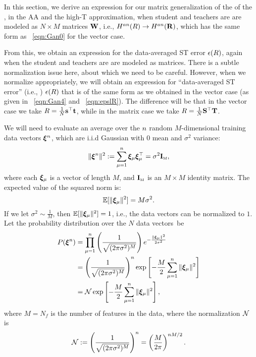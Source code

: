 In this section, we derive an expression for our matrix generalization of the \AnnealedHamiltonian of the \LinearPerceptron,
in the AA and the high-T approximation, when student and teachers are are modeled as $N \times M$ matrices ${\mathbf{W}}$,
i.e., $H^{an}(R)\rightarrow H^{an}(\mathbf{R})$, which has the same form as \EQN~\ref{eqn:Gan0} for the vector case.

From this, we obtain an expression for the data-averaged ST error $\epsilon(R)$, again when the student and teachers are are modeled as matrices.
There is a subtle normalization issue here, about which we need to be careful.
However, when we normalize appropriately, we will obtain an expression
for ``data-averaged ST error'' (i.e., \EffectivePotential) $\epsilon(R)$ that is of the same form as we obtained in the vector case (as given in \EQN~\ref{eqn:Gan4} and \EQN~\ref{eqn:epslR}).
%
The difference will be that in the vector case we take $R=\tfrac{1}{N}{\mathbf{s}}^{\top}{\mathbf{t}}$, while in the matrix case we take $R=\tfrac{1}{N}{\mathbf{S}}^{\top}{\mathbf{T}}$.

We will need to evaluate an average over the $n$ random $M$-dimensional training data vectors $\boldsymbol{\xi}^{n}$,
which are i.i.d Gaussian with $0$ mean and $\sigma^{2}$ variance: 
\begin{equation}
  \label{eqn:XInorm}
  \Vert \boldsymbol{\xi}^{n} \Vert^2 :=\sum_{\mu=1}^{n} \boldsymbol{\xi}_\mu \boldsymbol{\xi}_\mu^{\top} = \sigma^{2}\mathbf{I}_{\text{\tiny M}} ,
\end{equation}
where each $\boldsymbol{\xi}_{\mu}$ is a vector of length $M$, and $\mathbf{I}_{\text{\tiny M}}$ is an $M \times M$ identity matrix.
%
The expected value of the squared norm is:
\begin{equation}
\mathbb{E}[\Vert \boldsymbol{\xi}_{\mu} \Vert^2] = M \sigma^2 .
\end{equation}
If we let $\sigma^{2}\sim\tfrac{1}{M}$, 
then $\mathbb{E}[\Vert \boldsymbol{\xi}_{\mu} \Vert^2]=1$, i.e., the data vectors can be normalized to $1$.
%
Let the probability distribution over the $N$ data vectors~be
\begin{align}
\nonumber
  P(\boldsymbol{\xi}^{n}) &= \prod_{\mu=1}^{n} \left( \frac{1}{\sqrt{(2 \pi \sigma^2)^M}} \right) e^{-\frac{\|\boldsymbol{\xi}_{\mu}\|^2}{2 \sigma^2}} \\ 
\nonumber
  &= \left( \frac{1}{\sqrt{(2 \pi \sigma^2)^M}} \right)^{n} \exp\left[-\frac{M}{2}\sum_{\mu=1}^{n}\|\boldsymbol{\xi}_{\mu}\|^2\right] \\ 
  \label{eqn:pndx_vec}
  &= \mathcal{N} \exp\left[-\frac{M}{2}\sum_{\mu=1}^{n}\|\boldsymbol{\xi}_{\mu}\|^2\right] ,
\end{align}
where $M=N_f$ is the number of features in the data, where the normalization $\mathcal{N}$ is
\begin{align}
\label{eqn:xinorm}
\mathcal{N} 
:=\left( \frac{1}{\sqrt{(2 \pi \sigma^2)^M}} \right)^{n}
 =\left( \frac{M}{2\pi} \right)^{n M/2} .
\end{align}

